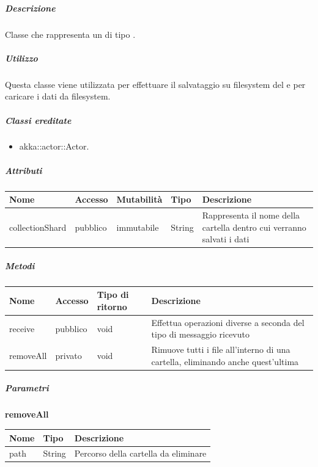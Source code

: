 \documentclass{scalatekids-article}
\begin{document}
\subparagraph{Descrizione}
Classe che rappresenta un  di tipo .

\subparagraph{Utilizzo}
Questa classe viene utilizzata per effettuare il salvataggio su filesystem del
 e per caricare i dati da filesystem.

\subparagraph{Classi ereditate}

\begin{itemize}

\item akka::actor::Actor.

\end{itemize}

\subparagraph{Attributi}
\begin{tabular}{| p{3cm} | p{1.5cm} | p{2cm} | p{2cm} | p{8.5cm} |}
  \hline
  Nome & Accesso & Mutabilità & Tipo & Descrizione\\
  \hline
  collectionShard & pubblico & immutabile & String & Rappresenta il nome della cartella dentro cui verranno salvati i dati \\
  \hline
\end{tabular}

\subparagraph{Metodi}
\begin{tabular}{| l | l | l | l |}
  \hline
  Nome & Accesso & Tipo di ritorno & Descrizione\\
  \hline
  receive & pubblico & void & Effettua operazioni diverse a seconda del tipo di messaggio ricevuto \\
  \hline
  removeAll & privato & void & Rimuove tutti i file all'interno di una cartella, eliminando anche quest'ultima \\
  \hline
\end{tabular}

\subparagraph{Parametri}

\begin{center}
  \textbf{removeAll}\\
\end{center}
\begin{tabular}{| l | l | l |}
  \hline
  Nome & Tipo & Descrizione\\
  \hline
  path & String & Percorso della cartella da eliminare\\
  \hline
\end{tabular}

\end{document}
